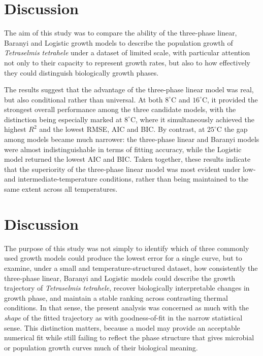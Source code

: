 \documentclass[11pt,onecolumn,draftclsnofoot]{IEEEtran}
\begin{document}
\section{Discussion}
The aim of this study was to compare the ability of the three-phase linear, Baranyi and Logistic growth models to describe the population growth of \textit{Tetraselmis tetrahele} under a dataset of limited scale, with particular attention not only to their capacity to represent growth rates, but also to how effectively they could distinguish biologically growth phases. 

The results suggest that the advantage of the three-phase linear model was real, but also conditional rather than universal. At both $8^\circ\mathrm{C}$ and $16^\circ\mathrm{C}$, it provided the strongest overall performance among the three candidate models, with the distinction being especially marked at $8^\circ\mathrm{C}$, where it simultaneously achieved the highest $R^2$ and the lowest RMSE, AIC and BIC. By contrast, at $25^\circ\mathrm{C}$ the gap among models became much narrower: the three-phase linear and Baranyi models were almost indistinguishable in terms of fitting accuracy, while the Logistic model returned the lowest AIC and BIC. Taken together, these results indicate that the superiority of the three-phase linear model was most evident under low- and intermediate-temperature conditions, rather than being maintained to the same extent across all temperatures.


\section{Discussion}

The purpose of this study was not simply to identify which of three commonly used growth models could produce the lowest error for a single curve, but to examine, under a small and temperature-structured dataset, how consistently the three-phase linear, Baranyi and Logistic models could describe the growth trajectory of \textit{Tetraselmis tetrahele}, recover biologically interpretable changes in growth phase, and maintain a stable ranking across contrasting thermal conditions. In that sense, the present analysis was concerned as much with the \emph{shape} of the fitted trajectory as with goodness-of-fit in the narrow statistical sense. This distinction matters, because a model may provide an acceptable numerical fit while still failing to reflect the phase structure that gives microbial or population growth curves much of their biological meaning.
\end{document}
